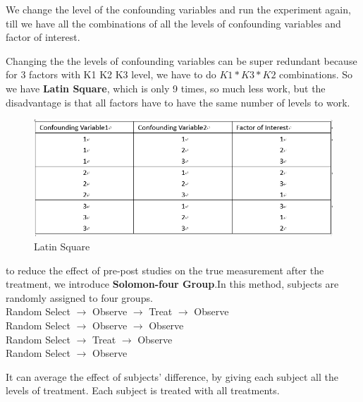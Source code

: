 We change the level of the confounding variables and run the experiment again, till we have all the combinations of all the levels of confounding variables and factor of interest.
\vspace{3ex}
\begin{center}
\end{center}
Changing the the levels of confounding variables can be super redundant because for 3 factors with K1 K2 K3 level, we have to do \(K1*K3*K2\) combinations. So we have \textbf{Latin Square}, which is only 9 times, so much less work, but the disadvantage is that all factors have to have the same number of levels to work.
    \begin{figure}[H]
        \centering
        \includegraphics[width=15cm]{cf.png}
        \caption{Latin Square}
        \label{fig:my_label}
    \end{figure}
\vspace{3ex}
\begin{center}
\end{center}
to reduce the effect of pre-post studies on the true measurement after the treatment, we introduce \textbf{Solomon-four Group}.In this method, subjects are randomly assigned to four groups.\\
    Random Select $\rightarrow$ Observe $\rightarrow$ Treat $\rightarrow$ Observe\\Random Select $\rightarrow$ Observe  $\rightarrow$ Observe\\Random Select  $\rightarrow$ Treat $\rightarrow$ Observe\\Random Select  $\rightarrow$ Observe
\vspace{3ex}
\begin{center}
\end{center}
It can average the effect of subjects' difference, by giving each subject all the levels of treatment. Each subject is treated with all treatments.

\vfill
\newpage


                                                                                                                                                                                                                                                                                                                                                                                                                                                                                                                                                                                                                                                                                                  